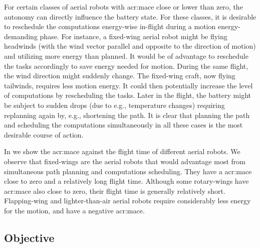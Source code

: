 For certain classes of aerial robots with \Gls{acr:mace} close or lower than zero, the autonomy can directly influence the battery state. For these classes, it is desirable to reschedule the computations energy-wise in-flight during a motion energy-demanding phase. For instance, a fixed-wing aerial robot might be flying headwinds (with the wind vector parallel and opposite to the direction of motion) and utilizing more energy than planned. It would be of advantage to reschedule the tasks accordingly to save energy needed for motion. During the same flight, the wind direction might suddenly change. The fixed-wing craft, now flying tailwinds, requires less motion energy. It could then potentially increase the level of computations by rescheduling the tasks. Later in the flight, the battery might be subject to sudden drops (due to e.g., temperature changes) requiring replanning again by, e.g., shortening the path. It is clear that planning the path and scheduling the computations simultaneously in all these cases is the most desirable course of action.

In  we show the \Gls{acr:mace} against the flight time of different aerial robots. We observe that fixed-wings are the aerial robots that would advantage most from simultaneous path planning and computations scheduling. They have a \Gls{acr:mace} close to zero and a relatively long flight time. Although some rotary-wings have \Gls{acr:mace} also close to zero, their flight time is generally relatively short. Flapping-wing and lighter-than-air aerial robots require considerably less energy for the motion, and have a negative \Gls{acr:mace}.

\subsection{Objective}
\label{sec:objective}

